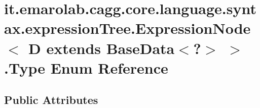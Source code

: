\hypertarget{enumit_1_1emarolab_1_1cagg_1_1core_1_1language_1_1syntax_1_1expressionTree_1_1ExpressionNode_3_0363af5135f2d339d59aaa050c16cb161}{\section{it.\-emarolab.\-cagg.\-core.\-language.\-syntax.\-expression\-Tree.\-Expression\-Node$<$ D extends Base\-Data$<$?$>$ $>$.Type Enum Reference}
\label{enumit_1_1emarolab_1_1cagg_1_1core_1_1language_1_1syntax_1_1expressionTree_1_1ExpressionNode_3_0363af5135f2d339d59aaa050c16cb161}
}
\subsection*{Public Attributes}
